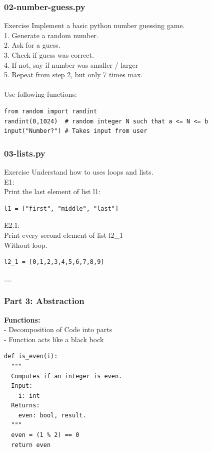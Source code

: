 \documentclass{beamer}
\begin{document}
\begin{frame}[fragile]
	\frametitle{02-number-guess.py}
	\begin{exampleblock}{Exercise}
Implement a basic python number guessing game.\\
1. Generate a random number.\\
2. Ask for a guess.\\
3. Check if guess was correct.\\
4. If not, say if number was smaller / larger\\
5. Repeat from step 2, but only 7 times max.\\
~\\
Use following functions:
		\begin{verbatim}
from random import randint
randint(0,1024)  # random integer N such that a <= N <= b
input("Number?") # Takes input from user
		\end{verbatim}
	\end{exampleblock}
\end{frame}


\begin{frame}[fragile]
	\frametitle{03-lists.py}
	\begin{exampleblock}{Exercise}
		Understand how to uses loops and lists.\\
E1:\\
Print the last element of list l1:
\begin{verbatim}
l1 = ["first", "middle", "last"]
\end{verbatim}
E2.1:\\
Print every second element of list l2\_1\\
Without loop.
\begin{verbatim}
l2_1 = [0,1,2,3,4,5,6,7,8,9]
\end{verbatim}
....
	\end{exampleblock}
\end{frame}




\begin{frame}[fragile]
	\frametitle{\textbf{Part 3:} Abstraction}	
	\textbf{Functions:}\\
	- Decomposition of Code into parts\\
	- Function acts like a black bock
	\begin{verbatim}
def is_even(i):
  """
  Computes if an integer is even.
  Input:
  	i: int
  Returns:
  	even: bool, result.
  """
  even = (1 % 2) == 0
  return even
\end{verbatim}
\end{frame}
\end{document}
